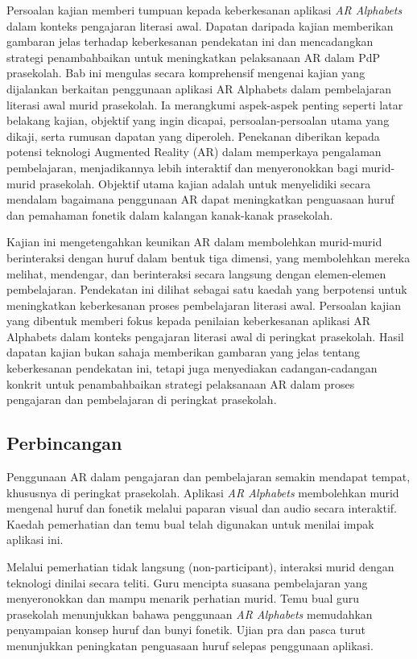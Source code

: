 {{Persoalan kajian memberi tumpuan kepada keberkesanan aplikasi \textit{AR Alphabets} dalam konteks pengajaran literasi awal. Dapatan daripada kajian memberikan gambaran jelas terhadap keberkesanan pendekatan ini dan mencadangkan strategi penambahbaikan untuk meningkatkan pelaksanaan AR dalam PdP prasekolah.
Bab ini mengulas secara komprehensif mengenai kajian yang dijalankan berkaitan penggunaan aplikasi AR Alphabets dalam pembelajaran literasi awal murid prasekolah. Ia merangkumi aspek-aspek penting seperti latar belakang kajian, objektif yang ingin dicapai, persoalan-persoalan utama yang dikaji, serta rumusan dapatan yang diperoleh. Penekanan diberikan kepada potensi teknologi Augmented Reality (AR) dalam memperkaya pengalaman pembelajaran, menjadikannya lebih interaktif dan menyeronokkan bagi murid-murid prasekolah. Objektif utama kajian adalah untuk menyelidiki secara mendalam bagaimana penggunaan AR dapat meningkatkan penguasaan huruf dan pemahaman fonetik dalam kalangan kanak-kanak prasekolah.

Kajian ini mengetengahkan keunikan AR dalam membolehkan murid-murid berinteraksi dengan huruf dalam bentuk tiga dimensi, yang membolehkan mereka melihat, mendengar, dan berinteraksi secara langsung dengan elemen-elemen pembelajaran. Pendekatan ini dilihat sebagai satu kaedah yang berpotensi untuk meningkatkan keberkesanan proses pembelajaran literasi awal. Persoalan kajian yang dibentuk memberi fokus kepada penilaian keberkesanan aplikasi AR Alphabets dalam konteks pengajaran literasi awal di peringkat prasekolah. Hasil dapatan kajian bukan sahaja memberikan gambaran yang jelas tentang keberkesanan pendekatan ini, tetapi juga menyediakan cadangan-cadangan konkrit untuk penambahbaikan strategi pelaksanaan AR dalam proses pengajaran dan pembelajaran di peringkat prasekolah.
\subsection{Perbincangan}
Penggunaan AR dalam pengajaran dan pembelajaran semakin mendapat tempat, khususnya di peringkat prasekolah. Aplikasi \textit{AR Alphabets} membolehkan murid mengenal huruf dan fonetik melalui paparan visual dan audio secara interaktif. Kaedah pemerhatian dan temu bual telah digunakan untuk menilai impak aplikasi ini.

Melalui pemerhatian tidak langsung (non-participant), interaksi murid dengan teknologi dinilai secara teliti. Guru mencipta suasana pembelajaran yang menyeronokkan dan mampu menarik perhatian murid. Temu bual guru prasekolah menunjukkan bahawa penggunaan \textit{AR Alphabets} memudahkan penyampaian konsep huruf dan bunyi fonetik. Ujian pra dan pasca turut menunjukkan peningkatan penguasaan huruf selepas penggunaan aplikasi.

}}
